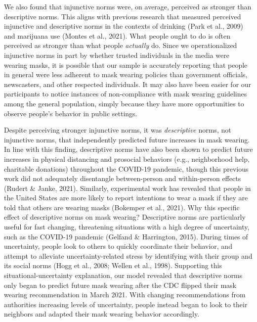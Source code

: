 \documentclass[
  english,
  man,floatsintext]{apa6}
\begin{document}
We also found that injunctive norms were, on average, perceived as stronger than descriptive norms. This aligns with previous research that measured perceived injunctive and descriptive norms in the contexts of drinking (Park et al., 2009) and marijuana use (Montes et al., 2021). What people ought to do is often perceived as stronger than what people \emph{actually} do. Since we operationalized injunctive norms in part by whether trusted individuals in the media were wearing masks, it is possible that our sample is accurately reporting that people in general were less adherent to mask wearing policies than government officials, newscasters, and other respected individuals. It may also have been easier for our participants to notice instances of non-compliance with mask wearing guidelines among the general population, simply because they have more opportunities to observe people's behavior in public settings.

Despite perceiving stronger injunctive norms, it was \emph{descriptive} norms, not injunctive norms, that independently predicted future increases in mask wearing. In line with this finding, descriptive norms have also been shown to predict future increases in physical distancing and prosocial behaviors (e.g., neighborhood help, charitable donations) throughout the COVID-19 pandemic, though this previous work did not adequately disentangle between-person and within-person effects (Rudert \& Janke, 2021). Similarly, experimental work has revealed that people in the United States are more likely to report intentions to wear a mask if they are told that others are wearing masks (Bokemper et al., 2021). Why this specific effect of descriptive norms on mask wearing? Descriptive norms are particularly useful for fast changing, threatening situations with a high degree of uncertainty, such as the COVID-19 pandemic (Gelfand \& Harrington, 2015). During times of uncertainty, people look to others to quickly coordinate their behavior, and attempt to alleviate uncertainty-related stress by identifying with their group and its social norms (Hogg et al., 2008; Wellen et al., 1998). Supporting this situational-uncertainty explanation, our model revealed that descriptive norms only began to predict future mask wearing after the CDC flipped their mask wearing recommendation in March 2021. With changing recommendations from authorities increasing levels of uncertainty, people instead began to look to their neighbors and adapted their mask wearing behavior accordingly.
\end{document}
